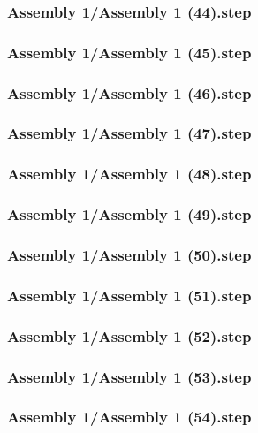 \documentclass[a4paper,12pt]{article}
\begin{document}
\subsubsection{Assembly 1/Assembly 1 (44).step}

\subsubsection{Assembly 1/Assembly 1 (45).step}

\subsubsection{Assembly 1/Assembly 1 (46).step}

\subsubsection{Assembly 1/Assembly 1 (47).step}

\subsubsection{Assembly 1/Assembly 1 (48).step}

\subsubsection{Assembly 1/Assembly 1 (49).step}

\subsubsection{Assembly 1/Assembly 1 (50).step}

\subsubsection{Assembly 1/Assembly 1 (51).step}

\subsubsection{Assembly 1/Assembly 1 (52).step}

\subsubsection{Assembly 1/Assembly 1 (53).step}

\subsubsection{Assembly 1/Assembly 1 (54).step}

\end{document}
